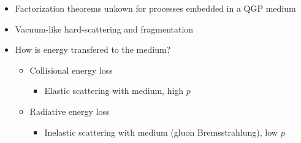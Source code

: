 \begin{frame}
\begin{columns}
    \begin{itemize}
    \item Factorization theorems unkown for processes embedded in a QGP medium
    \item Vacuum-like hard-scattering and fragmentation
    \item How is energy transfered to the medium?
      \begin{itemize}
      \item Collisional energy loss
        \begin{itemize}
        \item Elastic scattering with medium, high $p$
        \end{itemize}
      \item Radiative energy loss
        \begin{itemize}
        \item Inelastic scattering with medium (gluon Bremsstrahlung), low $p$
        \end{itemize}
      \end{itemize}
    \end{itemize}
  \end{columns}
\end{frame}
